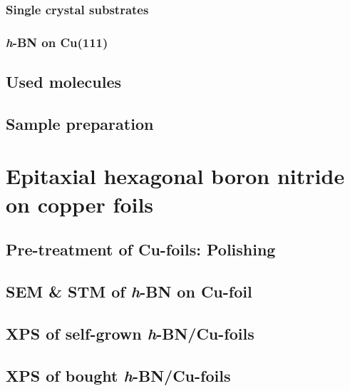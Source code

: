 \documentclass[
10pt,					%
a4paper,				%
twoside,				%
BCOR=8mm,				%
headings=normal,		%
headsepline,			%
footsepline,			%
plainfootsepline,		%
]{scrbook}
\begin{document}
     \subsection{Single crystal substrates}
        
%        
\clearpage             
     \subsection{\textit{h}-BN on Cu(111)}
		
  \section{Used molecules}
    
  \section{Sample preparation}
    

\chapter{Epitaxial hexagonal boron nitride on copper foils}
  
\section{Pre-treatment of Cu-foils: Polishing}
  	
  \section{SEM \& STM of \textit{h}-BN on Cu-foil}
     
  \section{XPS of self-grown \textit{h}-BN/Cu-foils}
     
  \section{XPS of bought \textit{h}-BN/Cu-foils}
     
\end{document}
